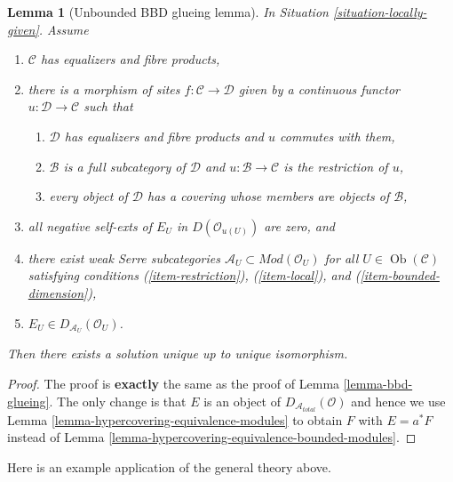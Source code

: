 \documentclass{stacks-project}
\theoremstyle{plain}
\newtheorem{lemma}[subsection]{Lemma}
\theoremstyle{definition}
\theoremstyle{remark}
\numberwithin{equation}{subsection}
\def\Ob{\mathop{\mathrm{Ob}}\nolimits}
\begin{document}
\begin{lemma}[Unbounded BBD glueing lemma]
\label{lemma-bbd-unbounded-glueing}
In Situation \ref{situation-locally-given}. Assume
\begin{enumerate}
\item $\mathcal{C}$ has equalizers and fibre products,
\item there is a morphism of sites $f : \mathcal{C} \to \mathcal{D}$
given by a continuous functor $u : \mathcal{D} \to \mathcal{C}$
such that
\begin{enumerate}
\item $\mathcal{D}$ has equalizers and fibre products and $u$
commutes with them,
\item $\mathcal{B}$ is a full subcategory of $\mathcal{D}$
and $u : \mathcal{B} \to \mathcal{C}$ is the restriction of $u$,
\item every object of $\mathcal{D}$ has a covering whose members
are objects of $\mathcal{B}$,
\end{enumerate}
\item all negative self-exts of $E_U$ in $D(\mathcal{O}_{u(U)})$ are zero, and
\item there exist weak Serre subcategories
$\mathcal{A}_U \subset \textit{Mod}(\mathcal{O}_U)$ for all
$U \in \Ob(\mathcal{C})$ satisfying conditions (\ref{item-restriction}),
(\ref{item-local}), and (\ref{item-bounded-dimension}),
\item $E_U \in D_{\mathcal{A}_U}(\mathcal{O}_U)$.
\end{enumerate}
Then there exists a solution unique up to unique isomorphism.
\end{lemma}

\begin{proof}
The proof is {\bf exactly} the same as the proof of
Lemma \ref{lemma-bbd-glueing}. The only change is that
$E$ is an object of $D_{\mathcal{A}_{total}}(\mathcal{O})$
and hence we use Lemma \ref{lemma-hypercovering-equivalence-modules}
to obtain $F$ with $E = a^*F$
instead of Lemma \ref{lemma-hypercovering-equivalence-bounded-modules}.
\end{proof}

\noindent
Here is an example application of the general theory above.
\end{document}
